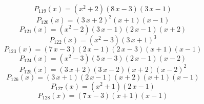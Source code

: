 \subitem \begin{dmath*}P_{119}(x) = {\left(x^{2} + 2\right)} {\left(8 \, x - 3\right)} {\left(3 \, x - 1\right)} \end{dmath*}\vspace{- 1.20000000000000 cm}
\subitem \begin{dmath*}P_{120}(x) = {\left(3 \, x + 2\right)}^{2} {\left(x + 1\right)} {\left(x - 1\right)} \end{dmath*}\vspace{- 1.20000000000000 cm}
\subitem \begin{dmath*}P_{121}(x) = {\left(x^{2} - 2\right)} {\left(3 \, x - 1\right)} {\left(2 \, x - 1\right)} {\left(x + 2\right)} \end{dmath*}\vspace{- 1.20000000000000 cm}
\subitem \begin{dmath*}P_{122}(x) = {\left(x^{2} - 3\right)} {\left(3 \, x + 1\right)}^{3} \end{dmath*}\vspace{- 1.20000000000000 cm}
\subitem \begin{dmath*}P_{123}(x) = {\left(7 \, x - 3\right)} {\left(2 \, x - 1\right)} {\left(2 \, x - 3\right)} {\left(x + 1\right)} {\left(x - 1\right)} \end{dmath*}\vspace{- 1.20000000000000 cm}
\subitem \begin{dmath*}P_{124}(x) = {\left(x^{2} - 3\right)} {\left(5 \, x - 3\right)} {\left(2 \, x - 1\right)} {\left(x - 2\right)} \end{dmath*}\vspace{- 1.20000000000000 cm}
\subitem \begin{dmath*}P_{125}(x) = {\left(3 \, x + 2\right)} {\left(3 \, x - 2\right)} {\left(x + 2\right)} {\left(x - 2\right)}^{2} \end{dmath*}\vspace{- 1.20000000000000 cm}
\subitem \begin{dmath*}P_{126}(x) = {\left(3 \, x + 1\right)} {\left(2 \, x - 1\right)} {\left(x + 2\right)} {\left(x + 1\right)} {\left(x - 1\right)} \end{dmath*}\vspace{- 1.20000000000000 cm}
\subitem \begin{dmath*}P_{127}(x) = {\left(x^{2} + 1\right)} {\left(2 \, x - 1\right)} \end{dmath*}\vspace{- 1.20000000000000 cm}
\subitem \begin{dmath*}P_{128}(x) = {\left(7 \, x - 3\right)} {\left(x + 1\right)} {\left(x - 1\right)} \end{dmath*}\vspace{- 1.20000000000000 cm}
